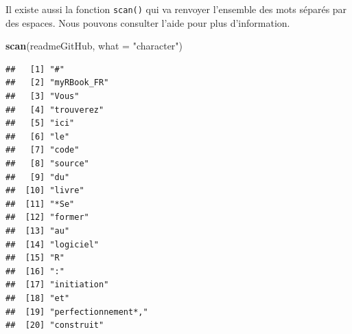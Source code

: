 \documentclass[]{book}
\newenvironment{Shaded}{\begin{snugshade}}{\end{snugshade}}
\newcommand{\DataTypeTok}[1]{\textcolor[rgb]{0.13,0.29,0.53}{#1}}
\newcommand{\KeywordTok}[1]{\textcolor[rgb]{0.13,0.29,0.53}{\textbf{#1}}}
\newcommand{\NormalTok}[1]{#1}
\newcommand{\StringTok}[1]{\textcolor[rgb]{0.31,0.60,0.02}{#1}}
\begin{document}
Il existe aussi la fonction \texttt{scan()} qui va renvoyer l'ensemble des mots séparés par des espaces. Nous pouvons consulter l'aide pour plus d'information.

\begin{Shaded}
\begin{Highlighting}[]
\KeywordTok{scan}\NormalTok{(readmeGitHub, }\DataTypeTok{what =} \StringTok{"character"}\NormalTok{)}
\end{Highlighting}
\end{Shaded}

\begin{verbatim}
##   [1] "#"                                                                                      
##   [2] "myRBook_FR"                                                                             
##   [3] "Vous"                                                                                   
##   [4] "trouverez"                                                                              
##   [5] "ici"                                                                                    
##   [6] "le"                                                                                     
##   [7] "code"                                                                                   
##   [8] "source"                                                                                 
##   [9] "du"                                                                                     
##  [10] "livre"                                                                                  
##  [11] "*Se"                                                                                    
##  [12] "former"                                                                                 
##  [13] "au"                                                                                     
##  [14] "logiciel"                                                                               
##  [15] "R"                                                                                      
##  [16] ":"                                                                                      
##  [17] "initiation"                                                                             
##  [18] "et"                                                                                     
##  [19] "perfectionnement*,"                                                                     
##  [20] "construit"                                                                              

\end{verbatim}
\end{document}
